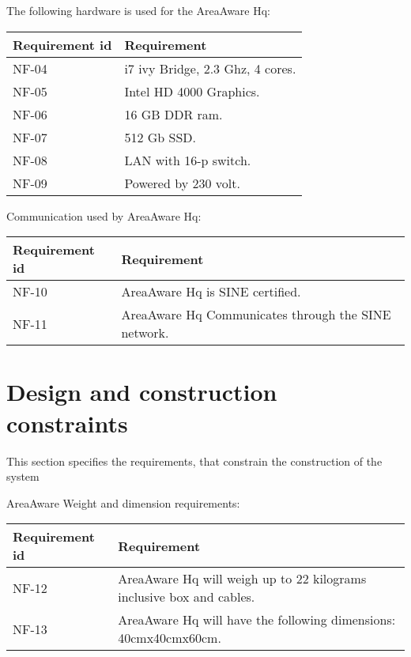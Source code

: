 The following hardware is used for the AreaAware Hq:
\begin{longtable}{| p{3.2cm} |  p{10cm} | }
	\hline
	\textbf{Requirement id} &  \textbf{Requirement } \\
	\hline
	NF-04 & i7 ivy Bridge, 2.3 Ghz, 4 cores.  \\
	\hline
	NF-05 & Intel HD 4000 Graphics.  \\
	\hline
	NF-06 & 16 GB DDR ram.  \\
	\hline
	NF-07 &512 Gb SSD. \\
	\hline
	NF-08 & LAN with 16-p switch.  \\
	\hline
	NF-09 & Powered by 230 volt. \\
	\hline
\end{longtable}

Communication used by AreaAware Hq:
\begin{longtable}{| p{3.2cm} |  p{10cm} | }
	\hline
	\textbf{Requirement id} &  \textbf{Requirement } \\
	\hline
	NF-10 & AreaAware Hq is SINE certified.  \\
	\hline
	NF-11 & AreaAware Hq Communicates through the SINE network. \\
	\hline
\end{longtable}





\section{Design and construction constraints}
This section specifies the requirements, that constrain the construction of the system

AreaAware Weight and dimension requirements:
\begin{longtable}{| p{3.2cm} |  p{10cm} | }
	\hline
	\textbf{Requirement id} &  \textbf{Requirement } \\
	\hline
	NF-12 & AreaAware Hq will weigh up to 22 kilograms inclusive box and cables.  \\
	\hline
	NF-13 & AreaAware Hq will have the following dimensions: 40cmx40cmx60cm. \\
	\hline
\end{longtable}


